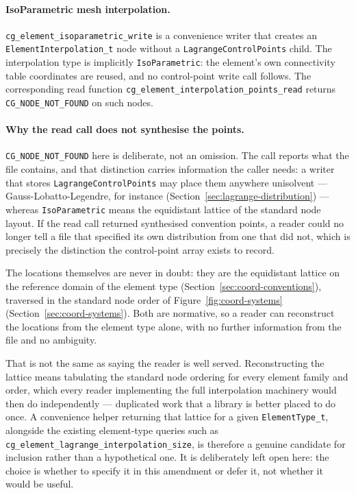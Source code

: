 \documentclass[11pt,letterpaper]{article}
\begin{document}
\paragraph{IsoParametric mesh interpolation.}
\texttt{cg\_element\_isoparametric\_write} is a convenience writer that creates an
\texttt{ElementInterpolation\_t} node without a \texttt{LagrangeControlPoints} child.  The
interpolation type is implicitly
\texttt{IsoParametric}: the element's own connectivity table coordinates are reused, and no
control-point write call follows.  The corresponding read function
\texttt{cg\_element\_interpolation\_points\_read} returns \texttt{CG\_NODE\_NOT\_FOUND} on such
nodes.

\paragraph{Why the read call does not synthesise the points.}
\texttt{CG\_NODE\_NOT\_FOUND} here is deliberate, not an omission.  The call reports what the
file contains, and that distinction carries information the caller needs: a writer that stores
\texttt{LagrangeControlPoints} may place them anywhere unisolvent --- Gauss-Lobatto-Legendre,
for instance (Section~\ref{sec:lagrange-distribution}) --- whereas
\texttt{IsoParametric} means the equidistant lattice of the standard node layout.  If the read
call returned synthesised convention points, a reader could no longer tell a file that
specified its own distribution from one that did not, which is precisely the distinction the
control-point array exists to record.

The locations themselves are never in doubt: they are the equidistant lattice on the reference
domain of the element type (Section~\ref{sec:coord-conventions}), traversed in the standard node
order of Figure~\ref{fig:coord-systems} (Section~\ref{sec:coord-systems}).  Both are normative,
so a reader can reconstruct the locations from the element type alone, with no further
information from the file and no ambiguity.

That is not the same as saying the reader is well served.  Reconstructing the lattice means
tabulating the standard node ordering for every element family and order, which every reader
implementing the full interpolation machinery would then do independently --- duplicated work
that a library is better placed to do once.  A convenience helper returning that lattice for a
given \texttt{ElementType\_t}, alongside the existing element-type queries such as
\texttt{cg\_element\_lagrange\_interpolation\_size}, is therefore a genuine candidate for
inclusion rather than a hypothetical one.  It is deliberately left open here: the choice is
whether to specify it in this amendment or defer it, not whether it would be useful.
\end{document}
